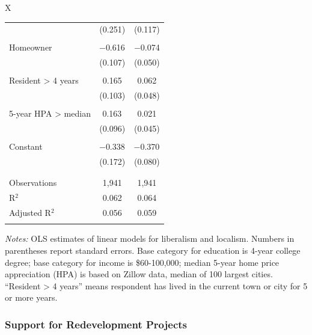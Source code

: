 \documentclass[article,12pt]{memoir}
\begin{document}
\begin{table}
\begin{threeparttable}
\begin{tabularx}{\linewidth}{X}
\begin{tabular}{@{\extracolsep{5pt}}lcc}
  & (0.251) & (0.117) \\ 
  & & \\ 
 Homeowner & $-$0.616$^{}$ & $-$0.074 \\ 
  & (0.107) & (0.050) \\ 
  & & \\ 
 Resident > 4 years & 0.165 & 0.062 \\ 
  & (0.103) & (0.048) \\ 
  & & \\ 
 5-year HPA > median & 0.163$^{}$ & 0.021 \\ 
  & (0.096) & (0.045) \\ 
  & & \\ 
 Constant & $-$0.338$^{}$ & $-$0.370$^{}$ \\ 
  & (0.172) & (0.080) \\ 
  & & \\ 
\hline \\[-1.8ex] 
Observations & 1,941 & 1,941 \\ 
R$^{2}$ & 0.062 & 0.064 \\ 
Adjusted R$^{2}$ & 0.056 & 0.059 \\ 
\hline 
\hline \\[-1.8ex] 
\end{tabular} 

  \end{tabularx}
  \begin{tablenotes}[flushleft]
    \item \hspace{-.2em}\emph{Notes:} OLS estimates of linear models for liberalism and localism. Numbers in parentheses report standard errors. Base category for education is 4-year college degree; base category for income is \$60-100,000; median 5-year home price appreciation (HPA) is based on Zillow data, median of 100 largest cities. ``Resident > 4 years'' means respondent has lived in the current town or city for 5 or more years.
  \end{tablenotes}
  \end{threeparttable}
\end{table}

\subsubsection{Support for Redevelopment Projects}
\end{document}
